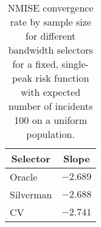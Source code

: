 \begin{table}[htbp]
\begin{center}
\begin{tabular}{lr}
\hline\hline
\multicolumn{1}{c}{Selector}&\multicolumn{1}{c}{Slope}\tabularnewline
\hline
Oracle&$-2.689$\tabularnewline
Silverman&$-2.688$\tabularnewline
CV&$-2.741$\tabularnewline
\hline
\end{tabular}
\caption[NMISE Convergence rate by sample size]{NMISE convergence rate by sample size for different bandwidth selectors for a fixed, single-peak risk function with expected number of incidents 100 on a uniform population.\label{tab:results:nmise_convergence_by_sample_size}}\end{center}
\end{table}
